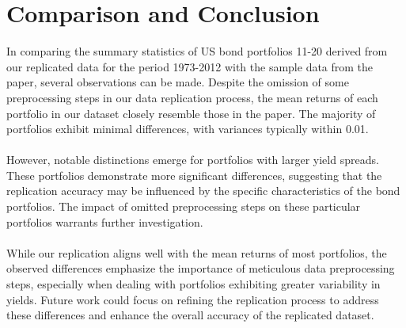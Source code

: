\documentclass{article}
\begin{document}
\section{ Comparison and Conclusion}
In comparing the summary statistics of US bond portfolios 11-20 derived from our replicated data for the period 1973-2012 with the sample data from the paper, several observations can be made. Despite the omission of some preprocessing steps in our data replication process, the mean returns of each portfolio in our dataset closely resemble those in the paper. The majority of portfolios exhibit minimal differences, with variances typically within 0.01.
\\\\ 
However, notable distinctions emerge for portfolios with larger yield spreads. These portfolios demonstrate more significant differences, suggesting that the replication accuracy may be influenced by the specific characteristics of the bond portfolios. The impact of omitted preprocessing steps on these particular portfolios warrants further investigation. 
\\\\ 
While our replication aligns well with the mean returns of most portfolios, the observed differences emphasize the importance of meticulous data preprocessing steps, especially when dealing with portfolios exhibiting greater variability in yields. Future work could focus on refining the replication process to address these differences and enhance the overall accuracy of the replicated dataset. 
\end{document}
